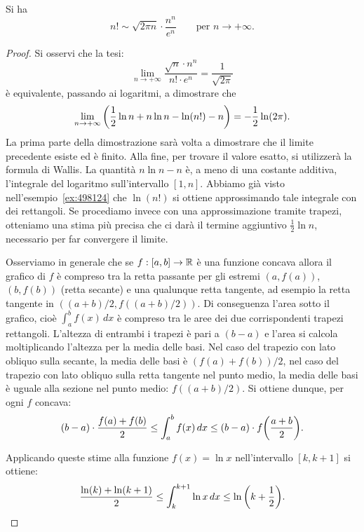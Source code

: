 \begin{theorem}
\label{th:stirling}%
\mymark{*}%
%
%
%
%
Si ha
\[
  n! \sim \sqrt{2\pi n}\cdot \frac{n^n}{e^n}
  \qquad \text{per $n\to +\infty$.}
\]
\end{theorem}
%
\begin{proof}
Si osservi che la tesi:
\[
  \lim_{n\to +\infty}\frac{\sqrt{n} \cdot n^n}{n!\cdot e^n } = \frac{1}{\sqrt{2\pi}}
\]
è equivalente, passando ai logaritmi, a dimostrare che
\[
   \lim_{n\to +\infty} {\left( \frac 1 2 \ln n + n \ln n - \ln(n!) - n \right)}
   = -\frac 1 2 \ln (2\pi).
\]
La prima parte della dimostrazione sarà volta a dimostrare che il limite
precedente esiste ed è finito. Alla fine, per trovare il valore esatto,
si utilizzerà la formula di Wallis.
La quantità $n\ln n - n$ è, a meno di una costante additiva, l'integrale
del logaritmo sull'intervallo $[1,n]$.
Abbiamo già visto nell'esempio~\ref{ex:498124}
che $\ln(n!)$ si ottiene approssimando tale integrale con dei rettangoli.
Se procediamo invece con una approssimazione tramite trapezi, otteniamo
una stima più precisa che ci darà il termine aggiuntivo $\frac 1 2 \ln n$,
necessario per far convergere il limite.

Osserviamo in generale che se $f:[a,b]\to {\mathbb R}$ è una funzione concava allora
il grafico di $f$ è compreso tra la retta passante per gli estremi $(a,f(a))$,
$(b,f(b))$ (retta secante) e una qualunque retta tangente, ad esempio la retta
tangente in $((a+b)/2,f((a+b)/2))$.
Di conseguenza l'area sotto il grafico, cioè $\int_a^b f(x)\, dx$ è compreso tra
le aree dei due corrispondenti trapezi rettangoli. L'altezza di entrambi i
trapezi è pari a $(b-a)$ e l'area si calcola moltiplicando l'altezza per la
media delle basi. Nel caso del trapezio con lato obliquo sulla secante, la media
delle basi è $(f(a)+f(b))/2$, nel caso del trapezio con lato obliquo sulla
retta tangente nel punto medio, la media delle basi è uguale alla sezione nel
punto medio: $f((a+b)/2)$. Si ottiene dunque,
per ogni $f$ concava:
\[
   (b-a)\cdot  \frac{f(a) + f(b)}{2}
   \le \int_a^b f(x) \, dx
   \le (b-a) \cdot f{\left( \frac{a+b}{2} \right)}.
\]

Applicando queste stime alla funzione $f(x) = \ln x$ nell'intervallo $[k, k+1]$
si ottiene:
\[
\frac{\ln(k) + \ln(k+1)}{2}
\le \int_k^{k+1} \ln x\, dx
\le \ln {\left( k+\frac 1 2 \right)}.
\]


\end{proof}
